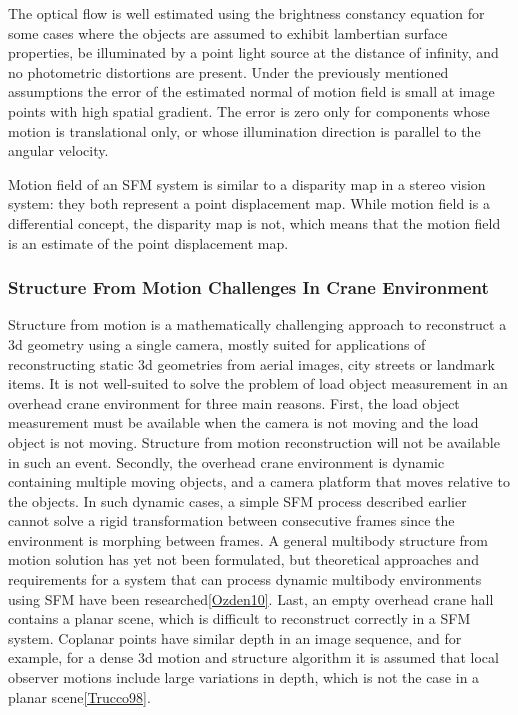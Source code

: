 \documentclass[12pt,a4paper,oneside,pdftex]{report}
\begin{document}
{The optical flow is well estimated using the brightness constancy equation for some cases where the objects are assumed to exhibit lambertian surface properties, be illuminated by a point light source at the distance of infinity, and  no photometric distortions are present. Under the previously mentioned assumptions the error of the estimated normal of motion field is small at image points with high spatial gradient. The error is zero only for components whose motion is translational only, or whose illumination direction is parallel to the angular velocity. 

Motion field of an SFM system is similar to a disparity map in a stereo vision system: they both represent a point displacement map. While motion field is a differential concept, the disparity map is not, which means that the motion field is an estimate of the point displacement map.

\subsubsection{Structure From Motion Challenges In Crane Environment}
\label{subsubsection:structure_from_motion_challenges_in_crane_environment}

Structure from motion is a mathematically challenging approach to reconstruct a 3d geometry using a single camera, mostly suited for applications of reconstructing static 3d geometries from aerial images, city streets or landmark items. It is not well-suited to solve the problem of load object measurement in an overhead crane environment for three main reasons. 
First, the load object measurement must be available when the camera is not moving and the load object is not moving. Structure from motion reconstruction will not be available in such an event. 
Secondly, the overhead crane environment is dynamic containing multiple moving objects, and a camera platform that moves relative to the objects. In such dynamic cases, a simple SFM process described earlier cannot solve a rigid transformation between consecutive frames since the environment is morphing between frames. A general multibody structure from motion solution has yet not been formulated, but theoretical approaches and requirements for a system that can process dynamic multibody environments using SFM have been researched\ref{Ozden10}.
Last, an empty overhead crane hall contains a planar scene, which is difficult to reconstruct correctly in a SFM system. Coplanar points have similar depth in an image sequence, and for example, for a dense 3d motion and structure algorithm it is assumed that local observer motions include large variations in depth, which is not the case in a planar scene\ref{Trucco98}.

}
\end{document}
